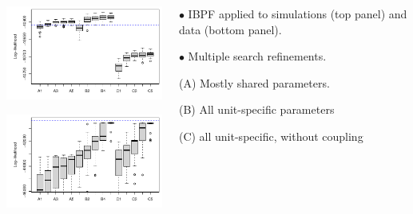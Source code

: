 \documentclass{beamer}
\begin{document}
\begin{frame}

\begin{columns}[T] %
\begin{column}{.75\textwidth}
  \includegraphics[width=7.5cm]{ibpf/sim_search_boxplot-1.pdf}

    \includegraphics[width=7.5cm]{ibpf/data_search_boxplot-1.pdf}

  \end{column}

\hspace{-15mm}
\begin{column}{.35\textwidth}
  \vspace{5mm}
  
$\bullet$    IBPF applied to simulations (top panel) and data (bottom panel).

    \vspace{5mm}

$\bullet$    Multiple search refinements.

    \vspace{5mm}
    
    (A) Mostly shared parameters.

    \vspace{5mm}

    (B) All unit-specific parameters

    \vspace{5mm}

    (C) all unit-specific, without coupling
    
  \end{column}
\end{columns}

\end{frame}
\end{document}
